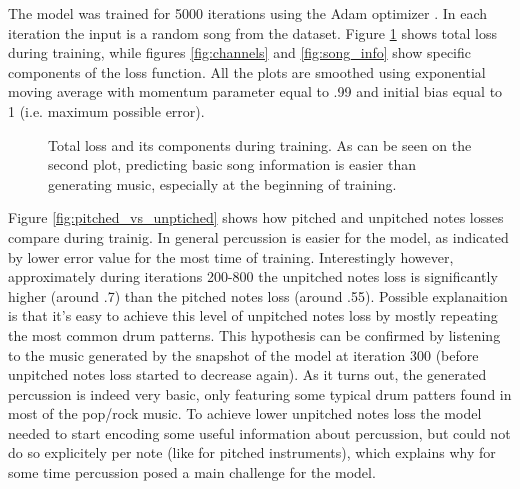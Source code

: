 \documentclass[en]{pracamgr}
\begin{document}
The model was trained for 5000 iterations using the Adam optimizer \cite{adam}.
In each iteration the input is a random song from the dataset.
Figure \ref{fig:total} shows total loss during training, while figures \ref{fig:channels} and \ref{fig:song_info} show specific components of the loss function.
All the plots are smoothed using exponential moving average with momentum parameter equal to .99 and initial bias equal to 1 (i.e. maximum possible error).

\begin{figure}
    \centering
    \caption{Total loss and its components during training. As can be seen on the second plot, predicting basic song information is easier than generating music, especially at the beginning of training.}
    \label{fig:total}
\end{figure}

Figure \ref{fig:pitched_vs_unptiched} shows how pitched and unpitched notes losses compare during trainig.
In general percussion is easier for the model, as indicated by lower error value for the most time of training.
Interestingly however, approximately during iterations 200-800 the unpitched notes loss is significantly higher (around .7) than the pitched notes loss (around .55).
Possible explanaition is that it's easy to achieve this level of unpitched notes loss by mostly repeating the most common drum patterns.
This hypothesis can be confirmed by listening to the music generated by the snapshot of the model at iteration 300 (before unpitched notes loss started to decrease again).
As it turns out, the generated percussion is indeed very basic, only featuring some typical drum patters found in most of the pop/rock music.
To achieve lower unpitched notes loss the model needed to start encoding some useful information about percussion, but could not do so explicitely per note (like for pitched instruments), which explains why for some time percussion posed a main challenge for the model.
\end{document}
